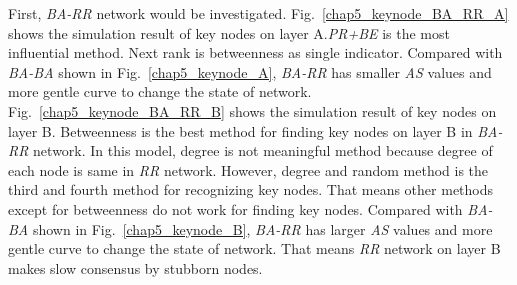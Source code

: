 First, \textit{BA-RR} network would be investigated.
Fig.~\ref{chap5_keynode_BA_RR_A} shows the simulation result of key nodes on layer A.\textit{PR+BE} is the most influential method. Next rank is betweenness as single indicator. Compared with \textit{BA-BA} shown in Fig.~\ref{chap5_keynode_A}, \textit{BA-RR} has smaller \textit{AS} values and more gentle curve to change the state of network. \\
Fig.~\ref{chap5_keynode_BA_RR_B} shows the simulation result of key nodes on layer B. Betweenness is the best method for finding key nodes on layer B in \textit{BA-RR} network. In this model, degree is not meaningful method because degree of each node is same in \textit{RR} network. However, degree and random method is the third and fourth method for recognizing key nodes. That means other methods except for betweenness do not work for finding key nodes. Compared with \textit{BA-BA} shown in Fig.~\ref{chap5_keynode_B}, \textit{BA-RR} has larger \textit{AS} values and more gentle curve to change the state of network. That means \textit{RR} network on layer B makes slow consensus by stubborn nodes.

